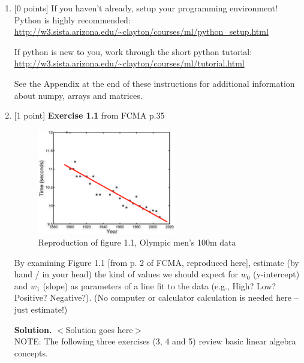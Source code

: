 \documentclass[10pt]{article}
\begin{document}
\newpage
\begin{enumerate}


\item \label{prob:1} [0 points]
If you haven't already, setup your programming environment!  Python is highly recommended:\\
\url{http://w3.sista.arizona.edu/~clayton/courses/ml/python_setup.html}

If python is new to you, work through the short python tutorial:\\
\url{http://w3.sista.arizona.edu/~clayton/courses/ml/tutorial.html}

See the Appendix at the end of these instructions for additional information about numpy, arrays and matrices.



\item \label{prob:2} [1 point]
{\bf Exercise 1.1} from FCMA p.35

\begin{figure}[htb]
\begin{center}
\includegraphics[width=6cm]{figures/figure1-1_p2}
\caption{Reproduction of figure 1.1, Olympic men's 100m data}
\end{center}
\end{figure}
By examining Figure 1.1 [from p. 2 of FCMA, reproduced here], estimate (by hand / in your head) the kind of values we should expect for $w_0$ (y-intercept) and $w_1$ (slope) as parameters of a line fit to the data (e.g., High? Low?  Positive?  Negative?).  (No computer or calculator calculation is needed here -- just estimate!)

{\bf Solution.} $<$Solution goes here$>$\\


\newpage
NOTE: The following three exercises (3, 4 and 5) review basic linear algebra concepts.


\end{enumerate}
\end{document}
